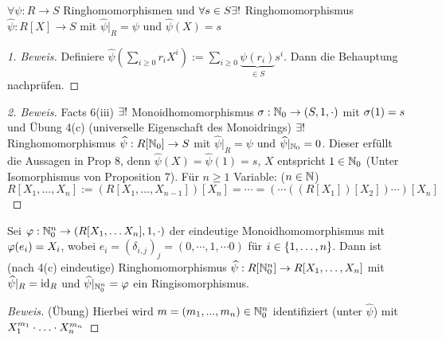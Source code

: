 \documentclass[a4paper]{report}
\begin{document}
\begin{prop} $\forall \psi : R \to S$ Ringhomomorphismen und $\forall s \in S \exists !$ Ringhomomorphismus $\hat \psi : R[X] \to S$ mit $\hat \psi|_{R} = \psi$ und $\hat \psi(X) = s$
\begin{proof}[1. Beweis]
  Definiere $\hat\psi(\sum_{i \ge 0}r_{i}X^{i}) := \sum_{i \ge 0}\underbrace{\psi(r_{i})}_{\in S}s^{i}$. Dann die Behauptung nachprüfen.
\end{proof}
\begin{proof}[2. Beweis]
  Facts 6(iii) $\exists !$ Monoidhomomorphismus $\sigma : \mathbb{N}_0 \to (S, 1, \cdot)$ mit $\sigma(1) = s$ und Übung 4(c) (universelle Eigenschaft des Monoidrings) $\exists !$ Ringhomomorphismus $\widehat \psi : R[\mathbb{N}_0] \to S$ mit $\hat \psi|_{R} = \psi$ und $\widehat\psi|_{\mathbb{N}_0} = 0$. Dieser erfüllt die Aussagen in Prop 8, denn $\hat \psi(X) = \hat \psi(1) = s$, $X$ entspricht $1 \in \mathbb{N}_0 $ (Unter Isomorphismus von Proposition 7).
  Für $n \ge 1$ Variable: ($n \in \mathbb{N}$)
  \[R[X_{1}, \ldots, X_{n}] := (R[X_{1}, \ldots, X_{n-1}])[X_{n}] = \cdots = (\cdots((R[X_{1}])[X_{2}]) \cdots)[X_{n}]\]
\end{proof}
\end{prop}

\begin{satz}
  Sei $\varphi : \mathbb{N}_0^{n} \to (R[X_{1}, \ldots X_{n}], 1, \cdot)$ der eindeutige Monoidhomomorphismus mit $\varphi(e_{i}) = X_{i}$, wobei $e_{i} = (\delta_{i,j})_{j} = (0, \cdots, 1, \cdots 0)$ für $i \in \{1, \ldots, n\}$. Dann ist (nach 4(c) eindeutige) Ringhomomorphismus $\widehat \psi : R[\mathbb{N}_0^{n}] \to R[X_{1}, \ldots, X_{n}]$ mit $\widehat \psi|_{R} = \operatorname{id}_{R}$ und $\widehat \psi|_{\mathbb{N}_0^{n}} = \varphi$ ein Ringisomorphismus.
  \begin{proof}[Beweis]
    (Übung) Hierbei wird $m = (m_{1}, ..., m_{n}) \in \mathbb{N}_0^{n}$ identifiziert (unter $\hat \psi$) mit $X_{1}^{m_{1}}\cdot \ldots \cdot X_{n}^{m_{n}}$
  \end{proof}
\end{satz}
\end{document}

